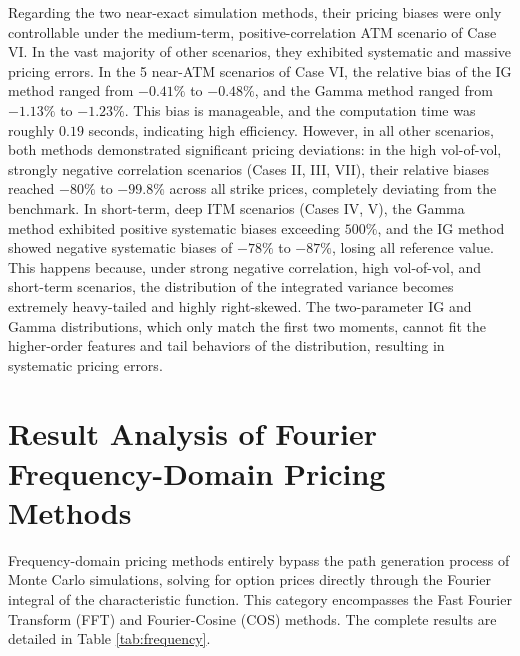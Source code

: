Regarding the two near-exact simulation methods, their pricing biases were only controllable under the medium-term, positive-correlation ATM scenario of Case VI. In the vast majority of other scenarios, they exhibited systematic and massive pricing errors. In the 5 near-ATM scenarios of Case VI, the relative bias of the IG method ranged from $-0.41\%$ to $-0.48\%$, and the Gamma method ranged from $-1.13\%$ to $-1.23\%$. This bias is manageable, and the computation time was roughly $0.19$ seconds, indicating high efficiency. However, in all other scenarios, both methods demonstrated significant pricing deviations: in the high vol-of-vol, strongly negative correlation scenarios (Cases II, III, VII), their relative biases reached $-80\%$ to $-99.8\%$ across all strike prices, completely deviating from the benchmark. In short-term, deep ITM scenarios (Cases IV, V), the Gamma method exhibited positive systematic biases exceeding $500\%$, and the IG method showed negative systematic biases of $-78\%$ to $-87\%$, losing all reference value. This happens because, under strong negative correlation, high vol-of-vol, and short-term scenarios, the distribution of the integrated variance becomes extremely heavy-tailed and highly right-skewed. The two-parameter IG and Gamma distributions, which only match the first two moments, cannot fit the higher-order features and tail behaviors of the distribution, resulting in systematic pricing errors.

\section{Result Analysis of Fourier Frequency-Domain Pricing Methods}

Frequency-domain pricing methods entirely bypass the path generation process of Monte Carlo simulations, solving for option prices directly through the Fourier integral of the characteristic function. This category encompasses the Fast Fourier Transform (FFT) and Fourier-Cosine (COS) methods. The complete results are detailed in Table \ref{tab:frequency}.

